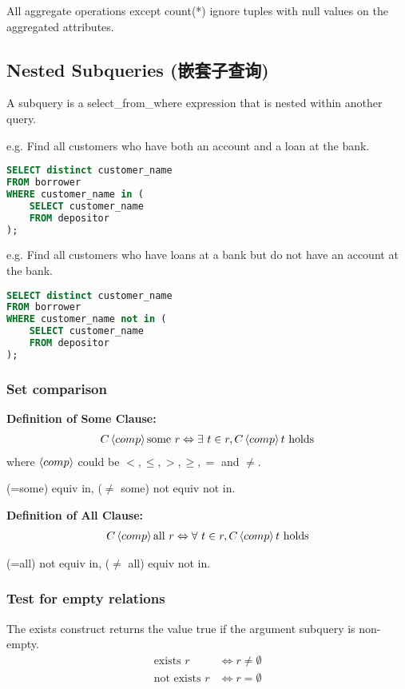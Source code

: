 All aggregate operations except count(*) ignore tuples with null values on the aggregated attributes.

\subsection{Nested Subqueries (嵌套子查询)}
A subquery is a select\_from\_where expression that is nested within another query. 

e.g. Find all customers who have both an account and a loan at the bank.
\begin{lstlisting}[language=sql]
SELECT distinct customer_name
FROM borrower
WHERE customer_name in (
    SELECT customer_name
    FROM depositor
);
\end{lstlisting}

e.g. Find all customers who have loans at a bank but do not have an account at the bank.
\begin{lstlisting}[language=sql]
SELECT distinct customer_name
FROM borrower
WHERE customer_name not in (
    SELECT customer_name
    FROM depositor
);
\end{lstlisting}


\subsubsection{Set comparison}
\textbf{Definition of Some Clause: }
\begin{align*}
    C \braket{comp} \text{some } r \Leftrightarrow \exists\  t \in r, C \braket{comp} t \text{ holds}
\end{align*}
where $\braket{comp}$ could be $<, \le, >, \ge, =$ and $\ne$.

(=some) equiv in, ($\ne$ some) not equiv not in.

\textbf{Definition of All Clause: }
\begin{align*}
    C \braket{comp} \text{all } r \Leftrightarrow \forall\  t \in r, C \braket{comp} t \text{ holds}
\end{align*}

(=all) not equiv in, ($\ne$ all) equiv not in.

\subsubsection{Test for empty relations}
The exists construct returns the value true if the argument subquery is non-empty.
\begin{align*}
    \text{exists }r &\Leftrightarrow r \ne \emptyset\\
    \text{not exists }r &\Leftrightarrow r = \emptyset
\end{align*}

